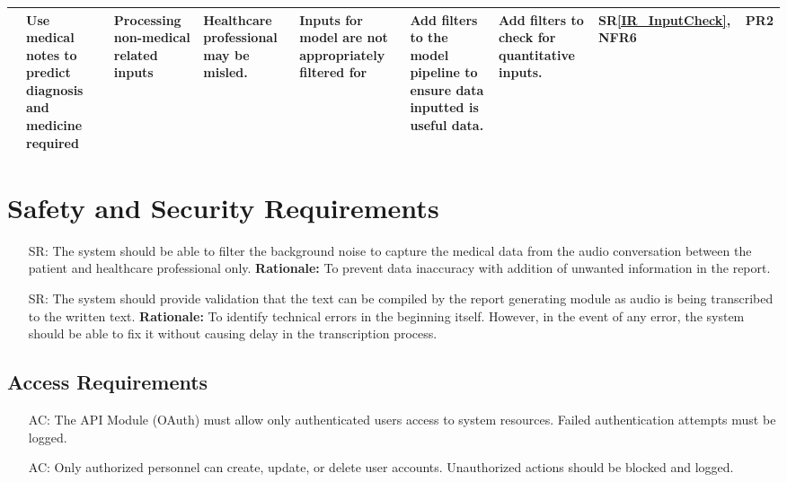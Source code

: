 \documentclass{article}
\newcounter{acnum} %
\newcounter{srnum} %
\begin{document}
\begin{landscape}
\begin{longtable}{|p{1.5cm}|p{2cm}|p{2.6cm}|p{2cm}|p{2cm}|p{2cm}|p{3.5cm}|p{1cm}|p{0.8cm}|}
        \midrule
        & \raggedright Use medical notes to predict diagnosis and medicine required & \raggedright Processing non-medical related inputs & \raggedright Healthcare professional may be misled. & \raggedright Inputs for model are not appropriately filtered for & \raggedright Add filters to the model pipeline to ensure data inputted is useful data. & \raggedright Add filters to check for quantitative inputs. & SR\ref{IR_InputCheck}, NFR6 & PR2 \\ 
        \bottomrule
    \end{longtable}
    
    
\end{landscape}

\section{Safety and Security Requirements}

\begin{itemize}
    \item [SR\refstepcounter{srnum}\thesrnum \label{SR_BackNoiseFilter}:] The system should be able to filter the background noise to capture the medical data from the audio conversation between the patient and healthcare professional only.
    \textbf{Rationale:} To prevent data inaccuracy with addition of unwanted information in the report.

    \item [SR\refstepcounter{srnum}\thesrnum \label{SR_CompilingVerification}:] The system should provide validation that the text can be compiled by the report generating module as audio is being transcribed to the written text.
    \textbf{Rationale:} To identify technical errors in the beginning itself. However, in the event of any error, the system should be able to fix it without causing delay in the transcription process. 

\end{itemize}


\subsection{Access Requirements}
\begin{itemize}
    \item [AC\refstepcounter{acnum}\theacnum \label{AC_Autentication}:] The API Module (OAuth) must allow only authenticated users access to system resources. Failed authentication attempts must be logged.
    \item [AC\refstepcounter{acnum}\theacnum \label{AC_AuthorizedPersonnel}:] Only authorized personnel can create, update, or delete user accounts. Unauthorized actions should be blocked and logged.
\end{itemize}
\end{document}
